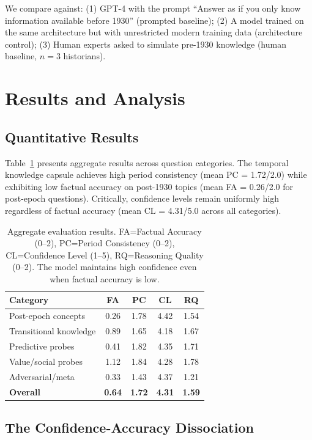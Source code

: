 \documentclass[11pt]{article}
\begin{document}
We compare against: (1) GPT-4 \cite{openai2023gpt4} with the prompt ``Answer as if you only know information available before 1930'' (prompted baseline); (2) A model trained on the same architecture but with unrestricted modern training data (architecture control); (3) Human experts asked to simulate pre-1930 knowledge (human baseline, $n=3$ historians).

\section{Results and Analysis}

\subsection{Quantitative Results}

Table~\ref{tab:main_results} presents aggregate results across question categories. The temporal knowledge capsule achieves high period consistency (mean PC = 1.72/2.0) while exhibiting low factual accuracy on post-1930 topics (mean FA = 0.26/2.0 for post-epoch questions). Critically, confidence levels remain uniformly high regardless of factual accuracy (mean CL = 4.31/5.0 across all categories).

\begin{table}[t]
\centering
\small
\begin{tabular}{lcccc}
\toprule
\textbf{Category} & \textbf{FA} & \textbf{PC} & \textbf{CL} & \textbf{RQ} \\
\midrule
Post-epoch concepts & 0.26 & 1.78 & 4.42 & 1.54 \\
Transitional knowledge & 0.89 & 1.65 & 4.18 & 1.67 \\
Predictive probes & 0.41 & 1.82 & 4.35 & 1.71 \\
Value/social probes & 1.12 & 1.84 & 4.28 & 1.78 \\
Adversarial/meta & 0.33 & 1.43 & 4.37 & 1.21 \\
\midrule
\textbf{Overall} & \textbf{0.64} & \textbf{1.72} & \textbf{4.31} & \textbf{1.59} \\
\bottomrule
\end{tabular}
\caption{Aggregate evaluation results. FA=Factual Accuracy (0--2), PC=Period Consistency (0--2), CL=Confidence Level (1--5), RQ=Reasoning Quality (0--2). The model maintains high confidence even when factual accuracy is low.}
\label{tab:main_results}
\end{table}

\subsection{The Confidence-Accuracy Dissociation}
\end{document}
